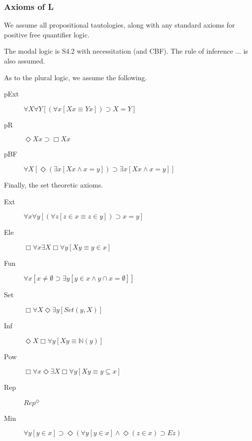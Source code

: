 \documentclass{article}
\begin{document}
\subsubsection{Axioms of L}
We assume all propositional tautologies, along with any standard axioms for positive free quantifier logic.

The modal logic is S4.2 with necessitation (and CBF). The rule of inference ... is also assumed.

As to the plural logic, we assume the following.
\begin{description}
    \item[pExt] $\forall X \forall Y [(\forall x[Xx \equiv Yx]) \supset X = Y]$
    \item[pR] $ \Diamond Xx \supset \Box Xx$
    \item[pBF] $\forall X[ \Diamond (\exists x[Xx \wedge x = y]) \supset \exists x [Xx \wedge x = y]]$
\end{description}
Finally, the set theoretic axioms.
\begin{description}
    \item[Ext] $\forall x \forall y [(\forall z[z \in x \equiv z \in y]) \supset x = y]$
    \item[Ele] $\Box \forall x \exists X \Box \forall y[Xy \equiv y \in x]$
    \item[Fun] $\forall x[ x \not = \emptyset \supset \exists y[y \in x \wedge y \cap x = \emptyset]]$
    \item[Set] $\Box \forall X \Diamond \exists y [Set(y, X)]$
    \item[Inf] $\Diamond X\Box \forall y[Xy \equiv \mathbb{N}(y)]$
    \item[Pow] $\Box \forall x \Diamond \exists X \Box \forall y [Xy \equiv y \subseteq x]$
    \item[Rep] $Rep^\Diamond$
    \item[Min] $\forall y[ y \in x] \supset \Diamond(\forall y[y \in x] \wedge \Diamond (z \in x) \supset Ez)$ 
\end{description}
\end{document}
